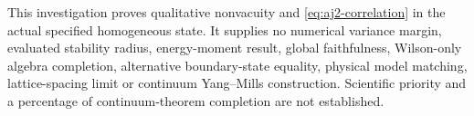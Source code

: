 This investigation proves qualitative nonvacuity and \eqref{eq:aj2-correlation} in the actual specified homogeneous state. It supplies no numerical variance margin, evaluated stability radius, energy-moment result, global faithfulness, Wilson-only algebra completion, alternative boundary-state equality, physical model matching, lattice-spacing limit or continuum Yang--Mills construction. Scientific priority and a percentage of continuum-theorem completion are not established.
